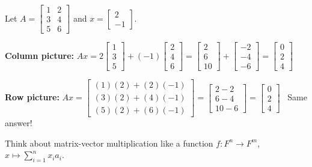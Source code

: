 \documentclass[11pt]{article}
\theoremstyle{definition}
\theoremstyle{plain}
\theoremstyle{remark}
\begin{document}
\begin{workedexample}[title=\textbf{Worked Example: Matrix-vector multiplication both ways}]
Let $A = \begin{bmatrix}1 & 2\\3 & 4\\5 & 6\end{bmatrix}$ and $x = \begin{bmatrix}2\\-1\end{bmatrix}$.

\textbf{Column picture:} $Ax = 2\begin{bmatrix}1\\3\\5\end{bmatrix} + (-1)\begin{bmatrix}2\\4\\6\end{bmatrix} = \begin{bmatrix}2\\6\\10\end{bmatrix} + \begin{bmatrix}-2\\-4\\-6\end{bmatrix} = \begin{bmatrix}0\\2\\4\end{bmatrix}$

\textbf{Row picture:} $Ax = \begin{bmatrix}(1)(2) + (2)(-1)\\(3)(2) + (4)(-1)\\(5)(2) + (6)(-1)\end{bmatrix} = \begin{bmatrix}2 - 2\\6 - 4\\10 - 6\end{bmatrix} = \begin{bmatrix}0\\2\\4\end{bmatrix}$ \quad \checkmark\ Same answer!
\end{workedexample}

\medskip
Think about matrix-vector multiplication like a function $f : F^n \to F^m$, $x \mapsto \sum_{i=1}^{n} x_i a_i$.
\end{document}

